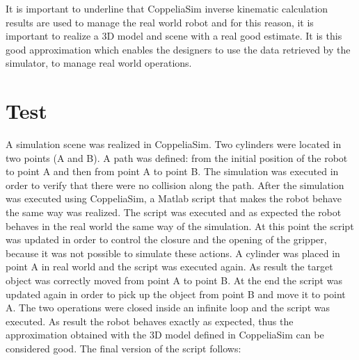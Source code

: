 It is important to underline that CoppeliaSim inverse kinematic calculation results are used to manage the real world robot and for this reason, it is important to realize a 3D model and scene with a real good estimate. It is this good approximation which enables the designers to use the data retrieved by the simulator, to manage real world operations.

\section{Test}
A simulation scene was realized in CoppeliaSim. Two cylinders were located in two points (A and B). A path was defined: from the initial position of the robot to point A and then from point A to point B. The simulation was executed in order to verify that there were no collision along the path. 
After the simulation was executed using CoppeliaSim, a Matlab script that makes the robot behave the same way was realized. The script was executed and as expected the robot behaves in the real world  the same way of the simulation.
At this point the script was updated in order to control the closure and the opening of the gripper, because it was not possible to simulate these actions. A cylinder was placed in point A in real world and the script was executed again. As result the target object was correctly moved from point A to point B. At the end the script was updated again in order to pick up the object from point B and move it to point A. The two operations were closed inside an infinite loop and the script was executed.
As result the robot behaves exactly as expected, thus the approximation obtained with the 3D model defined in CoppeliaSim can be considered good.
The final version of the script follows:


